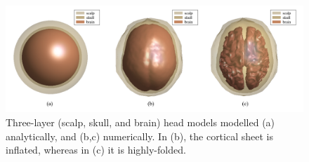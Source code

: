 \begin{figure}[!b]
\centering
\includegraphics[width=1\textwidth]{images/HeadModel.png} %
\caption{Three-layer (scalp, skull, and brain) head models modelled (a) analytically, and (b,c) numerically.
In (b), the cortical sheet is inflated, whereas in (c) it is highly-folded.}
\label{fig:HeadModel}
\end{figure}